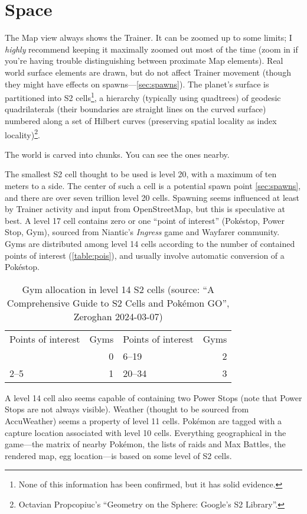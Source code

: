 \section{Space\label{sec:world}}
The Map view always shows the Trainer.
It can be zoomed up to some limits; I \textit{highly} recommend keeping it
 maximally zoomed out most of the time (zoom in if you're having trouble
 distinguishing between proximate Map elements).
Real world surface elements are drawn, but do not affect Trainer movement
 (though they might have effects on spawns---\autoref{sec:spawns}).
The planet's surface is partitioned into S2 cells\footnote{None of this information has been confirmed, but it has solid evidence.}, a hierarchy (typically using
 quadtrees) of geodesic quadrilaterals (their boundaries are straight lines on the curved
 surface) numbered along a set of Hilbert curves (preserving spatial locality as index locality)\footnote{Octavian Propcopiuc's ``Geometry on the Sphere: Google's S2 Library''.}.
\begin{tipbox}[title=If that meant nothing to you…]
The world is carved into chunks. You can see the ones nearby.
\end{tipbox}
The smallest S2 cell thought to be used is level 20, with a maximum of ten meters to a side.
The center of such a cell is a potential spawn point \autoref{sec:spawns}, and there are over seven trillion level 20 cells.
Spawning seems influenced at least by Trainer activity and input from OpenStreetMap, but this is speculative at best.
A level 17 cell contains zero or one ``point of interest'' (Pokéstop, Power Stop, Gym),
 sourced from Niantic's \textit{Ingress} game and Wayfarer community.
Gyms are distributed among level 14 cells according to the number of contained points of interest (\autoref{table:pois}),
 and usually involve automatic conversion of a Pokéstop.
\begin{table}
\centering
\begin{tabular}{lr|lr}
Points of interest & Gyms & Points of interest & Gyms\\
\Midrule
1 & 0 & 6--19 & 2\\
2--5 & 1 & 20--34 & 3\\
\end{tabular}
\caption[Gym allocation in level 14 S2 cells]{Gym allocation in level 14 S2 cells (source: ``A Comprehensive Guide to S2 Cells and Pokémon GO'', Zeroghan 2024-03-07)\label{table:pois}}
\end{table}
A level 14 cell also seems capable of containing two Power Stops (note that Power Stops are not always visible).
 Weather (thought to be sourced from AccuWeather) seems a property of level 11 cells.
Pokémon are tagged with a capture location associated with level 10 cells.
Everything geographical in the game---the matrix of nearby Pokémon, the lists
 of raids and Max Battles, the rendered map, egg location---is based on some level of S2 cells.
